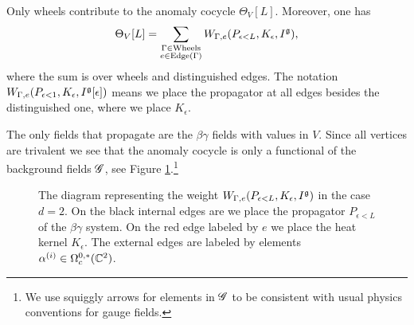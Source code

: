 \documentclass[10pt]{amsart}
\begin{document}
\begin{lem}
Only wheels contribute to the anomaly cocycle $\Theta_V[L]$. 
Moreover, one has
\[
\Theta_V[L] = \sum_{\substack{\Gamma \in \text{\rm Wheels}\\ e \in {\rm Edge}(\Gamma)}} W_{\Gamma,e}(P_{\epsilon<L}, K_\epsilon,
I^{\rm \mathfrak g}),
\]
where the sum is over wheels and distinguished edges.
The notation $W_{\Gamma,e}(P_{\epsilon<1}, K_\epsilon,
I^{\rm \mathfrak g}[\epsilon])$ means we place the propagator at all edges besides the distinguished one, where we place $K_\epsilon$. 
\end{lem}

The only fields that propagate are the $\beta\gamma$ fields with values in $V$. 
Since all vertices are trivalent we see that the anomaly cocycle is only a functional of the background fields $\mathscr G$, see Figure \ref{fig:liewheel}.\footnote{We use squiggly arrows for elements in $\mathscr G$ to be consistent with usual physics conventions for gauge fields.}

\begin{figure}
\begin{center}
\caption{The diagram representing the weight $W_{\Gamma, e}(P_{\epsilon<L}, K_\epsilon, I^\mathfrak g)$ in the case $d=2$. 
On the black internal edges are we place the propagator $P_{\epsilon < L}$ of the $\beta\gamma$ system. 
On the red edge labeled by $e$ we place the heat kernel $K_\epsilon$.
The external edges are labeled by elements $\alpha^{(i)} \in \Omega^{0,*}_c(\mathbb C^2)$.}
\label{fig:liewheel}
\end{center}
\end{figure}
\end{document}
